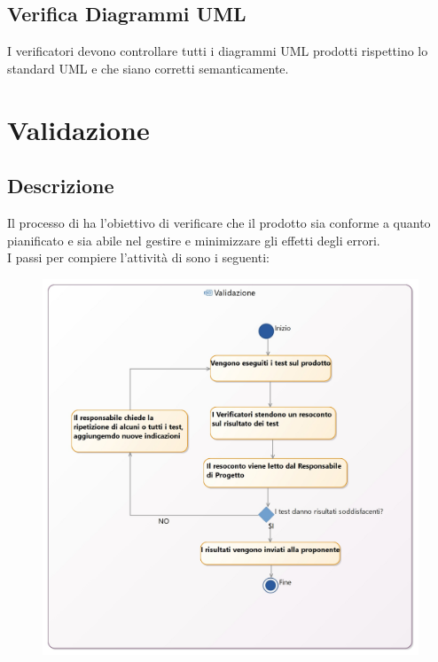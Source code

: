 \documentclass[NormeDiProgetto.tex]{subfiles}
\begin{document}
	\subsection{Verifica Diagrammi UML}
	I verificatori devono controllare tutti i diagrammi UML prodotti rispettino lo standard UML e che siano corretti semanticamente.

	\section{Validazione}
	\subsection{Descrizione}
		Il processo di  ha l'obiettivo di verificare che il prodotto sia conforme a quanto pianificato e sia abile nel gestire e minimizzare gli effetti degli errori.\\
		I passi per compiere l’attività di  sono i seguenti:
		\begin{figure}[H]
			\centering
			\includegraphics[width=1\linewidth]{../../common/images/Validation}
		\end{figure}
\end{document}

